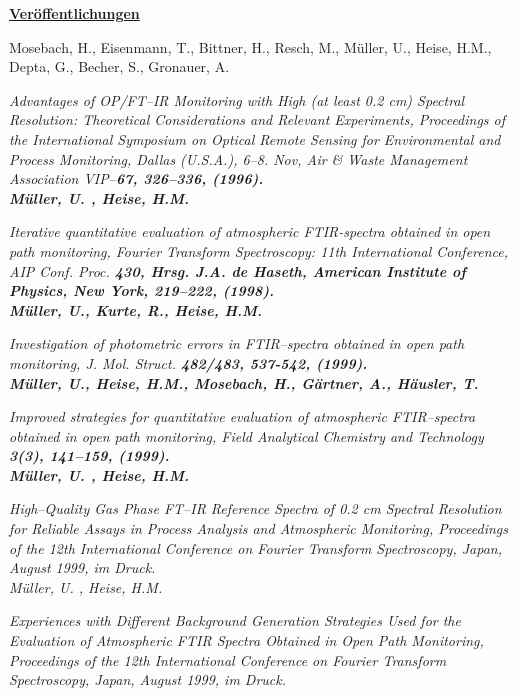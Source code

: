 \thispagestyle{empty}

\noindent \underline{\Large\bf Ver\"{o}ffentlichungen} \rm\\

\vspace{1.1cm}


\noindent Mosebach, H., Eisenmann, T., Bittner, H., Resch, M.,
M\"{u}ller, U., Heise, H.M.,  Depta, G.,  Becher, S., Gronauer, A.\

\noindent \it Advantages of OP/FT--IR Monitoring with High (at
least 0.2 cm) Spectral Resolution: Theoretical
Considerations and Relevant Experiments\rm , Proceedings of the
International Symposium on Optical Remote Sensing for
Environmental and Process Monitoring, Dallas (U.S.A.), 6--8. Nov,
Air \& Waste Management Association VIP--\bf 67\rm , 326--336,
(1996).\\

\noindent M\"{u}ller, U. , Heise, H.M.\

\noindent \it Iterative quantitative evaluation of atmospheric
FTIR-spectra obtained in open path monitoring\rm , Fourier
Transform Spectroscopy: 11th International Conference, AIP Conf.
Proc. \bf 430\rm , Hrsg. J.A. de Haseth, American Institute of
Physics, New York, 219--222, (1998).\\


\noindent M\"{u}ller, U., Kurte, R., Heise, H.M.\

\noindent \it Investigation of photometric errors in FTIR--spectra
obtained in open path monitoring\rm , J. Mol. Struct. \bf
482/483\rm , 537-542, (1999).\\


\noindent M\"{u}ller, U., Heise, H.M., Mosebach, H., G\"{a}rtner, A.,
H\"{a}usler, T.\

\noindent \it Improved strategies for quantitative evaluation of
atmospheric FTIR--spectra obtained in open path monitoring\rm ,
Field Analytical Chemistry and Technology \bf 3\rm (3), 141--159,
(1999).\\


\noindent M\"{u}ller, U. , Heise, H.M.\

\noindent \it High--Quality Gas Phase FT--IR Reference Spectra of
0.2 cm Spectral Resolution for Reliable Assays in Process
Analysis and Atmospheric Monitoring\rm , Proceedings of the 12th
International Conference on Fourier Transform Spectroscopy, Japan,
August 1999, im Druck.\\


\noindent M\"{u}ller, U. , Heise, H.M.\

\noindent \it Experiences with Different Background Generation
Strategies Used for the Evaluation of Atmospheric FTIR Spectra
Obtained in Open Path Monitoring\rm , Proceedings of the 12th
International Conference on Fourier Transform Spectroscopy, Japan,
August 1999, im Druck.\\

\cleardoublepage
